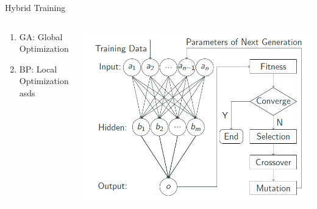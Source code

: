 \documentclass{beamer}
\begin{document}
\begin{frame}{Hybrid Training}
    \begin{columns}[c]
    \begin{column}{0.5\textwidth}
        \begin{enumerate}
            \item GA: Global Optimization
            \item BP: Local Optimization asds
        \end{enumerate}
    \end{column}
    \begin{column}{0.7\textwidth}
        \begin{center}
              \includegraphics[scale=0.3]{NAS/hybrid-training.png}
        \end{center}
    \end{column}
\end{columns}
\end{frame}
\end{document}
